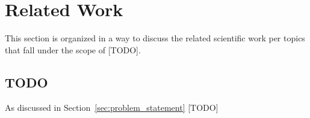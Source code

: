\section{Related Work}
\label{sec:related_work}
This section is organized in a way to discuss the related scientific work per topics that fall under the scope of [TODO].

\subsection{TODO}
\label{subsec:TODO}
As discussed in  Section~\ref{sec:problem_statement} [TODO]









